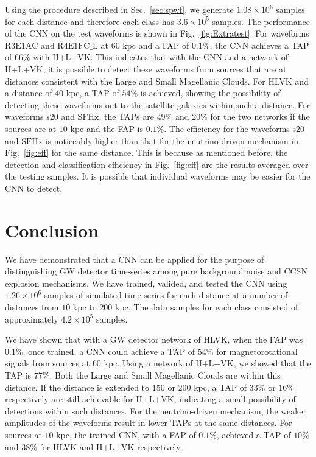 \documentclass[aps,twocolumn,showpacs,groupedaddress, nofootinbib]{revtex4}  %
\begin{document}
%
%
Using the procedure described in Sec.~\ref{sec:spwf}, we generate $1.08\times10^6$
samples for each distance and therefore each class has $3.6\times10^5$
samples. The performance of the \ac{CNN} on the test waveforms is shown in
Fig.~\ref{fig:Extratest}. For waveforms $\text{R3E1AC}$ and $\text{R4E1FC\_L}$
at $60$ kpc and a \ac{FAP} of $0.1\%$, the \ac{CNN} achieves a \ac{TAP} of $66\%$
with H+L+VK. This indicates that with the
\ac{CNN} and a network of H+L+VK, it is possible to detect these waveforms from sources that are at
distances consistent with the Large and Small Magellanic Clouds.
For HLVK and a distance of $40$ kpc, a \ac{TAP} of $54\%$ is achieved, showing the possibility of detecting 
these waveforms out to the satellite galaxies within such a distance.
For waveforms $\text{s}20$ and $\text{SFHx}$, the \acp{TAP} are $49\%$ and $20\%$ for the two
networks if the sources are at $10$ kpc and the \ac{FAP} is $0.1\%$.  The
efficiency for the waveforms $\text{s}20$ and $\text{SFHx}$ is noticeably
higher than that for the neutrino-driven mechanism in Fig.~\ref{fig:eff} for
the same distance. This is because as mentioned before, the detection and
classification efficiency in Fig.~\ref{fig:eff} are the results averaged over
the testing samples. It is possible that individual waveforms may be easier for
the \ac{CNN} to detect. 
\section{Conclusion}\label{sec:conclusion}
%
%
We have demonstrated that a \ac{CNN} can be applied for the purpose of
distinguishing \ac{GW} detector time-series among pure background noise and
\ac{CCSN} explosion mechanisms. We have trained, valided, and tested 
the \ac{CNN} using $1.26\times10^{6}$ samples of simulated time series for each distance at a
number of distances from $10$ kpc to $200$ kpc. The data samples for each
class consisted of approximately $4.2\times10^5$ samples. 

%
%
We have shown that with a \ac{GW} detector network of HLVK, when the \ac{FAP}
was $0.1\%$, once trained, a \ac{CNN} could achieve a \ac{TAP} of $54\%$
for magnetorotational signals from sources at $60$ kpc. Using a network of
H+L+VK, we showed that the \ac{TAP} is $77\%$.  Both the Large and
Small Magellanic Clouds are within this distance. If the distance is extended
to $150$ or $200$ kpc, a \ac{TAP} of $33\%$ or $16\%$ respectively are still
achievable for H+L+VK, indicating a small possibility of detections within
such distances. 
%
%
For the neutrino-driven mechanism, the weaker amplitudes of the waveforms
result in lower \acp{TAP} at the same distances.  For sources at $10$ kpc, the
trained \ac{CNN}, with a \ac{FAP} of $0.1\%$, achieved a \ac{TAP} of $10\%$ and
$38\%$ for HLVK and H+L+VK respectively. 
%
%
\end{document}
